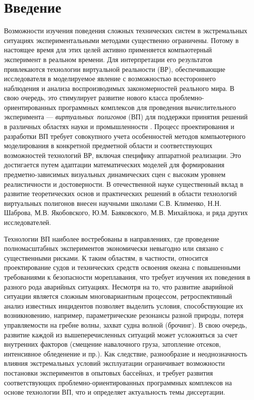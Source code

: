 \chapter*{Введение}

Возможности изучения поведения сложных технических систем в экстремальных ситуациях экспериментальными методами существенно ограничены. Потому в настоящее время для этих целей активно применяется компьютерный эксперимент в реальном времени. Для интерпретации его результатов привлекаются технологии виртуальной реальности (ВР), обеспечивающие  исследователя в моделируемое явление с возможностью всестороннего наблюдения и анализа воспроизводимых закономерностей реального мира. В свою очередь, это стимулирует развитие нового класса проблемно-ориентированных программных комплексов для проведения вычислительного эксперимента --- \mbox{\textit{виртуальных полигонов}} (ВП) для поддержки принятия решений в различных областях науки и промышленности \citep{sloot111}. Процесс проектирования и разработки ВП требует совокупного учета особенностей методов компьютерного моделирования в конкретной предметной области и соответствующих возможностей технологий ВР, включая специфику аппаратной реализации. Это достигается путем адаптации математических моделей для формирования предметно-зависимых визуальных динамических сцен с высоким уровнем реалистичности и достоверности. В отечественной науке существенный вклад в развитие теоретических основ и практических решений в области технологий виртуальных полигонов внесен научными школами С.В. Клименко, Н.Н. Шаброва, М.В. Якобовского, Ю.М. Баяковского, М.В. Михайлюка, и ряда других исследователей. 

 
Технологии ВП наиболее востребованы в направлениях, где проведение полномасштабных экспериментов экономически невыгодно или связано с существенными рисками. К таким областям, в частности, относится проектирование судов и технических средств освоения океана с повышенными требованиями к безопасности мореплавания, что требует изучения их поведения в разного рода аварийных ситуациях. Несмотря на то, что развитие аварийной ситуации является сложным многовариантным процессом, ретроспективный анализ известных инцидентов позволяет выделить условия, способствующие их возникновению, например, параметрические резонансы разной природы, потеря управляемости на гребне волны, захват судна волной (брочинг). В свою очередь, развитие каждой из вышеперечисленных ситуаций может усложняться за счет внутренних факторов (смещение навалочного груза, затопление отсеков, интенсивное обледенение и пр.). Как следствие, разнообразие и неоднозначность влияния экстремальных условий эксплуатации ограничивает возможности постановки экспериментов в опытовых бассейнах, и требует развития соответствующих проблемно-ориентированных программных комплексов на основе технологии ВП, что и определяет актуальность темы диссертации.

